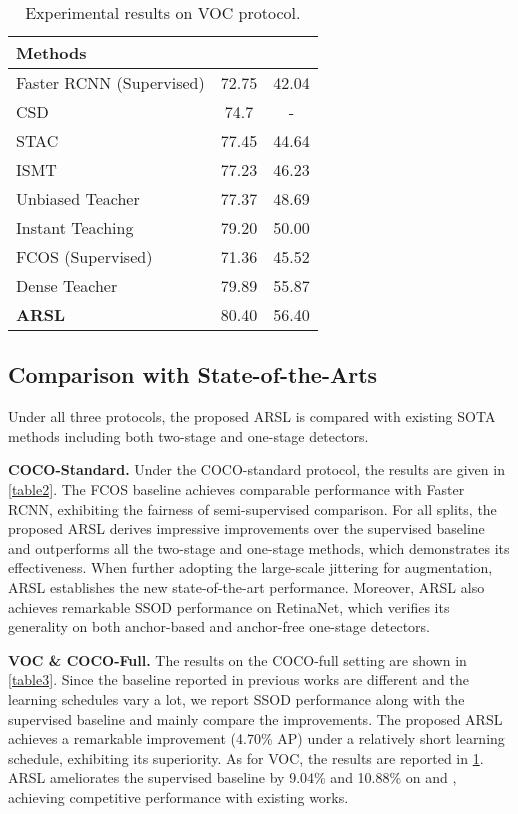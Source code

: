 \documentclass[10pt,twocolumn,letterpaper]{article}
\begin{document}
\begin{table}[t]
    \caption{Experimental results on VOC protocol.}
\centering
    \begin{tabular}{lcc}
    \hline
    Methods &  &  \\
    \hline
    Faster RCNN\cite{FasterRCNN} (Supervised) & 72.75 & 42.04 \\
    CSD\cite{CSD} & 74.7 & - \\
    STAC\cite{stac} & 77.45 & 44.64 \\
    ISMT\cite{ISMT} & 77.23 & 46.23 \\
    Unbiased Teacher\cite{UnbiasedTeacher} & 77.37 & 48.69 \\
    Instant Teaching\cite{InstantTea} & 79.20 & 50.00 \\
    \hline
    FCOS\cite{Fcos} (Supervised) & 71.36 & 45.52  \\
    Dense Teacher\cite{DenseTeacher} & 79.89 & 55.87 \\
    \textbf{ARSL} & 80.40 & 56.40 \\
    \hline
    \end{tabular}
    \label{table4}
\end{table}


\subsection{Comparison with State-of-the-Arts}
\label{sec4.2}

Under all three protocols, the proposed ARSL is compared with existing SOTA methods including both two-stage and one-stage detectors.

\noindent\textbf{COCO-Standard.}
Under the COCO-standard protocol, the results are given in \cref{table2}. 
The FCOS baseline achieves comparable performance with Faster RCNN, exhibiting the fairness of semi-supervised comparison.
For all splits, the proposed ARSL derives impressive improvements over the supervised baseline and outperforms all the two-stage and one-stage methods, which demonstrates its effectiveness.
When further adopting the large-scale jittering for augmentation, ARSL establishes the new state-of-the-art performance.
Moreover, ARSL also achieves remarkable SSOD performance on RetinaNet\cite{Focalloss}, which verifies its generality on both anchor-based and anchor-free one-stage detectors.

\noindent\textbf{VOC \& COCO-Full.}
The results on the COCO-full setting are shown in \cref{table3}.
Since the baseline reported in previous works are different and the learning schedules vary a lot, we report SSOD performance along with the supervised baseline and mainly compare the improvements.
The proposed ARSL achieves a remarkable improvement (4.70\% AP) under a relatively short learning schedule, exhibiting its superiority.
As for VOC, the results are reported in \cref{table4}.
ARSL ameliorates the supervised baseline by 9.04\% and 10.88\% on  and , achieving competitive performance with existing works.
\end{document}
